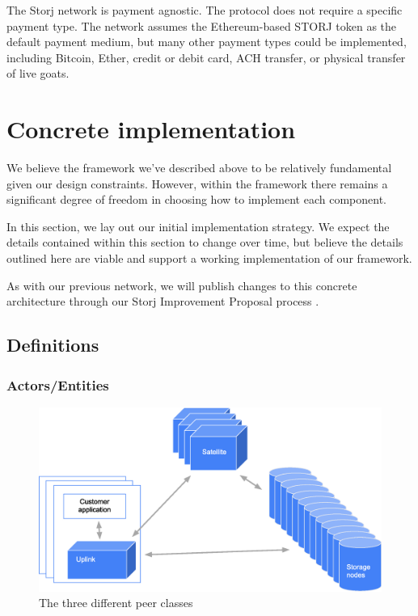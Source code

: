 \documentclass[11pt,fleqn,openany]{book}
\begin{document}
The Storj network is payment agnostic.
The protocol does not require a specific payment type.
The network assumes the Ethereum-based STORJ token as the default payment
medium, but many other payment types could be implemented, including Bitcoin,
Ether, credit or debit card, ACH transfer, or physical transfer of live goats.

\chapter{Concrete implementation}\label{chap:concrete}

We believe the framework we've described above to be relatively fundamental
given our design constraints. However, within the framework there remains a
significant degree of freedom in choosing how to implement each component.

In this section, we lay out our initial implementation strategy. We expect
the details contained within this section to change over time, but believe the
details outlined here are viable and support a working implementation of our
framework.

As with our previous network, we will publish changes to this concrete
architecture through our Storj Improvement Proposal process \cite{sips}.

\section{Definitions}

\subsection{Actors/Entities}

\begin{figure}
\centering
\includegraphics[width=\textwidth]{diagram-drafts/peers.eps}
\caption{The three different peer classes}
\end{figure}
\end{document}
